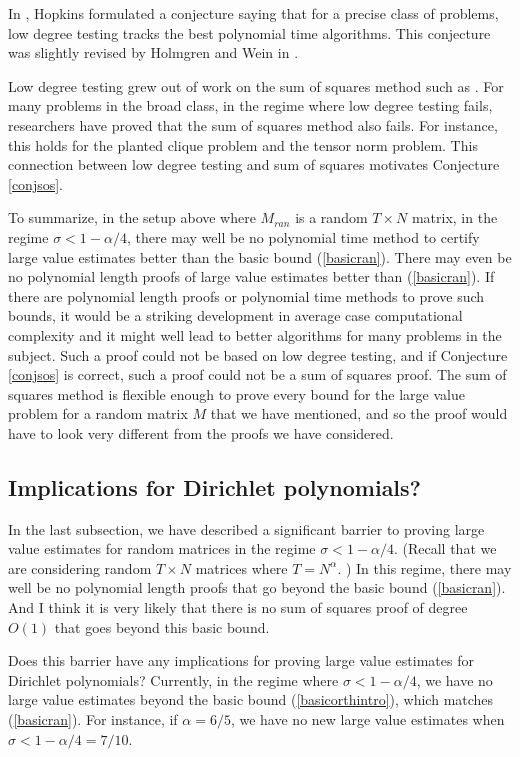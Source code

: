 \documentclass{amsart}
\begin{document}
In \cite{Ho},  Hopkins formulated a conjecture saying that for a precise class of problems,  low degree testing tracks the best polynomial time algorithms.   This conjecture was slightly revised by Holmgren and Wein in \cite{HW}.   

Low degree testing grew out of work on the sum of squares method such as \cite{BHKKMP}.  For many problems in the broad class,  in the regime where low degree testing fails,  researchers have proved that the sum of squares method also fails.   For instance,  this holds for the planted clique problem and the tensor norm problem.   This connection between low degree testing and sum of squares motivates Conjecture \ref{conjsos}.

To summarize,  in the setup above where $M_{ran}$ is a random $T \times N$ matrix,  in the regime $\sigma < 1 - \alpha / 4$,  there may well be no polynomial time method to certify large value estimates better than the basic bound (\ref{basicran}).   There may even be no polynomial length proofs of large value estimates better than (\ref{basicran}).   If there are polynomial length proofs or polynomial time methods to prove such bounds,  it would be a striking development in average case computational complexity and it might well lead to better algorithms for many problems in the subject.   Such a proof could not be based on low degree testing, and
if Conjecture \ref{conjsos} is correct,  such a proof could not be a sum of squares proof.    The sum of squares method is flexible enough to prove every bound for the large value problem for a random matrix $M$ that we have mentioned,  and so the proof would have to look very different from the proofs we have considered.  



\subsection{Implications for Dirichlet polynomials?}

In the last subsection,  we have described a significant barrier to proving large value estimates for random matrices in the regime $\sigma < 1 - \alpha/4$.   (Recall that we are considering random $T \times N$ matrices where $T = N^\alpha$. )  In this regime,  there may well be no polynomial length proofs that go beyond the basic bound (\ref{basicran}).   And I think it is very likely that there is no sum of squares proof of degree $O(1)$ that goes beyond this basic bound.

Does this barrier have any implications for proving large value estimates for Dirichlet polynomials?  Currently,  in the regime where $\sigma < 1 - \alpha/4$,  we have no large value estimates beyond the basic bound (\ref{basicorthintro}),  which matches (\ref{basicran}).   For instance,  if $\alpha = 6/5$,  we have no new large value estimates when $\sigma < 1 - \alpha/4 = 7/10$.
\end{document}
